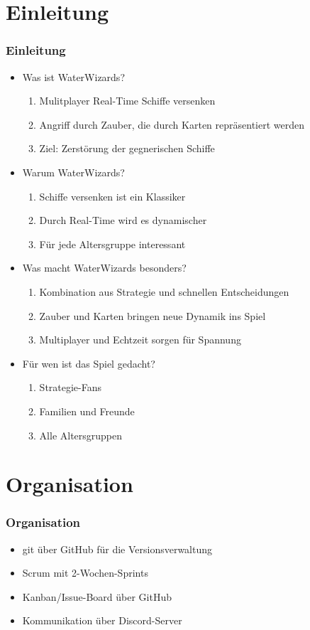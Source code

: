 \documentclass{beamer}
\begin{document}
\section{Einleitung}
\begin{frame}
\frametitle{Einleitung}
\begin{itemize}
  \item Was ist WaterWizards?
  \begin{enumerate}
    \item Mulitplayer Real-Time Schiffe versenken
    \item Angriff durch Zauber, die durch Karten repräsentiert werden
    \item Ziel: Zerstörung der gegnerischen Schiffe
  \end{enumerate}
  \item Warum WaterWizards?
  \begin{enumerate}
    \item Schiffe versenken ist ein Klassiker
    \item Durch Real-Time wird es dynamischer
    \item Für jede Altersgruppe interessant
  \end{enumerate}
  \item Was macht WaterWizards besonders?
    \begin{enumerate}
      \item Kombination aus Strategie und schnellen Entscheidungen
      \item Zauber und Karten bringen neue Dynamik ins Spiel
      \item Multiplayer und Echtzeit sorgen für Spannung
    \end{enumerate}
  \item Für wen ist das Spiel gedacht?
    \begin{enumerate}
      \item Strategie-Fans
      \item Familien und Freunde
      \item Alle Altersgruppen
    \end{enumerate}
\end{itemize}
\end{frame}

\section{Organisation}
\begin{frame}
  \frametitle{Organisation}
  \begin{itemize}
    \item git über GitHub für die Versionsverwaltung 
    \item Scrum mit 2-Wochen-Sprints
    \item Kanban/Issue-Board über GitHub
    \item Kommunikation über Discord-Server
  \end{itemize}
\end{frame}
\end{document}
